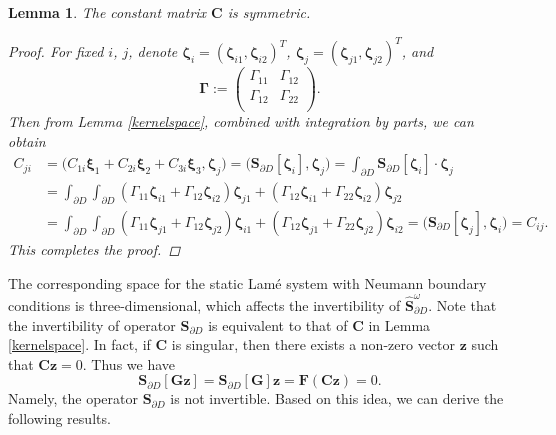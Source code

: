 \documentclass[10pt,reqno,oneside]{amsart}%
\newtheorem{lem}{Lemma}[section]
\theoremstyle{definition}
\theoremstyle{remark}
\numberwithin{equation}{section}
\numberwithin{equation}{section}
\begin{document}
\begin{lem}
The constant matrix ${\mathbf{C}}$ is symmetric.
\begin{proof}
For fixed $i$, $j$, denote $\boldsymbol{\zeta}_i=\left(\boldsymbol{\zeta}_{i1},\boldsymbol{\zeta}_{i2}\right)^T$, $\boldsymbol{\zeta}_j=\left(\boldsymbol{\zeta}_{j1},\boldsymbol{\zeta}_{j2}\right)^T$, and
$$
\boldsymbol{\Gamma}:=
\begin{pmatrix}
\Gamma_{11} &  \Gamma_{12} \\
\Gamma_{12} &  \Gamma_{22} \\
\end{pmatrix}.
$$
Then from Lemma \ref{kernelspace}, combined with integration by parts, we can obtain
\begin{align}
C_{ji}&=\Big(C_{1i}\boldsymbol{\xi}_1+C_{2i}\boldsymbol{\xi}_2+C_{3i}\boldsymbol{\xi}_3,\boldsymbol{\zeta}_j \Big)=\Big(\mathbf{S}_{\partial D}[\boldsymbol{\zeta}_i],\boldsymbol{\zeta}_j \Big)=\int_{\partial D}\mathbf{S}_{\partial D}[\boldsymbol{\zeta}_i]\cdot\boldsymbol{\zeta}_j\nonumber\\
&=\int_{\partial D}\int_{\partial D}\left(\Gamma_{11}\boldsymbol{\zeta}_{i1}+\Gamma_{12}\boldsymbol{\zeta}_{i2}\right)\boldsymbol{\zeta}_{j1}
+\left(\Gamma_{12}\boldsymbol{\zeta}_{i1}+\Gamma_{22}\boldsymbol{\zeta}_{i2}\right)\boldsymbol{\zeta}_{j2}\nonumber\\
&=\int_{\partial D}\int_{\partial D}\left(\Gamma_{11}\boldsymbol{\zeta}_{j1}+\Gamma_{12}\boldsymbol{\zeta}_{j2}\right)\boldsymbol{\zeta}_{i1}
+\left(\Gamma_{12}\boldsymbol{\zeta}_{j1}+\Gamma_{22}\boldsymbol{\zeta}_{j2}\right)\boldsymbol{\zeta}_{i2}=\Big(\mathbf{S}_{\partial D}[\boldsymbol{\zeta}_j],\boldsymbol{\zeta}_i \Big)=C_{ij}.\nonumber
\end{align}
This completes the proof.
\end{proof}
\end{lem}
The corresponding space for the static Lam\'e system with Neumann boundary conditions is three-dimensional, which affects the invertibility of $\hat{\mathbf{S}}_{\partial D}^{\omega}$. Note that the  invertibility of operator ${\mathbf{S}}_{\partial D}$ is equivalent to that of $\mathbf{C}$ in Lemma \ref{kernelspace}. In fact, if $\mathbf{C}$ is singular, then there exists a non-zero vector $\mathbf{z}$ such that $\mathbf{C}\mathbf{z}=0$. Thus we have
$$
\mathbf{S}_{\partial D}[\mathbf{G}\mathbf{z}]=\mathbf{S}_{\partial D}[\mathbf{G}]\mathbf{z}=\mathbf{F}(\mathbf{C}\mathbf{z})=0.
$$
Namely, the operator ${\mathbf{S}}_{\partial D}$ is not invertible. Based on this idea, we can derive the following results.
\end{document}

